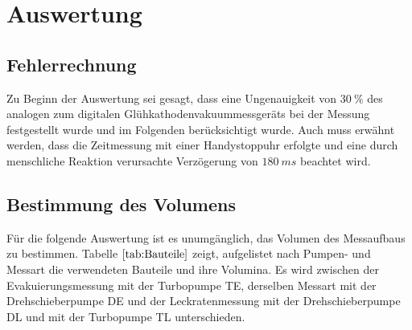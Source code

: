 \section{Auswertung}
\subsection{Fehlerrechnung}
Zu Beginn der Auswertung sei gesagt, dass eine Ungenauigkeit von $\SI{30}{\percent}$ des analogen zum digitalen Glühkathodenvakuummessgeräts
bei der Messung festgestellt wurde und im Folgenden berücksichtigt wurde.
Auch muss erwähnt werden, dass die Zeitmessung mit einer Handystoppuhr erfolgte und eine durch menschliche Reaktion verursachte
Verzögerung von $\SI{180}{ms}$ beachtet wird.\cite{reaktion}
\subsection{Bestimmung des Volumens}
Für die folgende Auswertung ist es unumgänglich, das Volumen des Messaufbaus zu bestimmen.
Tabelle $\ref{tab:Bauteile}$ zeigt, aufgelistet nach Pumpen- und Messart die verwendeten Bauteile und ihre Volumina.
Es wird zwischen der Evakuierungsmessung mit der Turbopumpe TE, derselben Messart mit der Drehschieberpumpe DE und der Leckratenmessung
mit der Drehschieberpumpe DL und mit der Turbopumpe TL unterschieden.\newline


